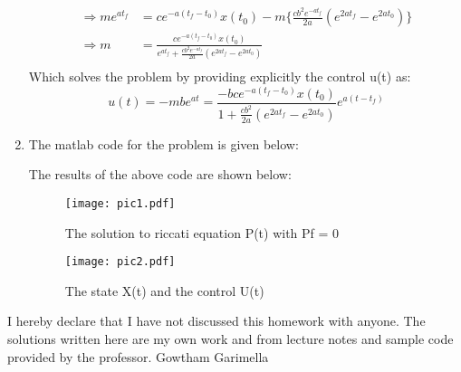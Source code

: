 \begin{enumerate}
\begin{align*}
   \Rightarrow m e^{at_f} &= c e^{-a(t_f - t_0)} x(t_0) - m \{ \frac{cb^2 e^{-at_f}}{2a} \left(e^{2at_f} - e^{2at_0}\right)\}\\
   \Rightarrow m &= \frac{c e^{-a(t_f - t_0)} x(t_0)} { e^{at_f} + \frac{cb^2 e^{-at_f}}{2a}\left( e^{2at_f} - e^{2at_0}\right)}\\
  \end{align*}
  Which solves the problem by providing explicitly the control u(t) as:
  \begin{equation*}
  u(t) = -mbe^{at} = \frac{-bc e^{-a(t_f - t_0)} x(t_0)} { 1 + \frac{cb^2}{2a}\left( e^{2at_f} - e^{2at_0}\right)}e^{a(t-t_f)}
  \end{equation*}
  \newpage
 \item The matlab code for the problem is given below:
  
  The results of the above code are shown below:
  \begin{figure}[h!]
   \texttt{[image: pic1.pdf]}
   \caption{The solution to riccati equation P(t) with Pf = 0}
   \label{fig1}
  \end{figure}
  \begin{figure}[h!]
   \texttt{[image: pic2.pdf]}
   \caption{The state X(t) and the control U(t)}
  \end{figure}









  

\end{enumerate} 
\begin{acknowledgements}
I hereby declare that I have not discussed this homework with anyone. The solutions written here are my own work and  from lecture notes and sample code provided by the professor. 
\flushright Gowtham Garimella
\end{acknowledgements}






